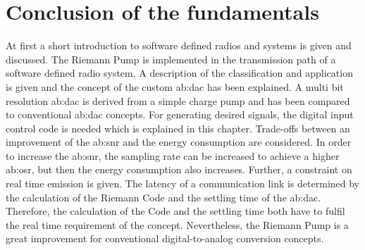 \section{Conclusion of the fundamentals} %
At first a short introduction to software defined radios and systems is given and discussed.
The Riemann Pump is implemented in the transmission path of a software defined radio system.
A description of the classification and application is given and the concept of the custom \gls{ab:dac} has been explained.
A multi bit resolution \gls{ab:dac} is derived from a simple charge pump and has been compared to conventional \gls{ab:dac} concepts.
For generating desired signals, the digital input control code is needed which is explained in this chapter.
Trade-offs between an improvement of the \gls{ab:snr} and the energy consumption are considered.
In order to increase the \gls{ab:snr}, the sampling rate can be increased to achieve a higher \gls{ab:osr}, but then the energy consumption also increases.
Further, a constraint on real time emission is given.
The latency of a communication link is determined by the calculation of the Riemann Code and the settling time of the \gls{ab:dac}.
Therefore, the calculation of the Code and the settling time both have to fulfil the real time requirement of the concept.
Nevertheless, the Riemann Pump is a great improvement for conventional digital-to-analog conversion concepts.
